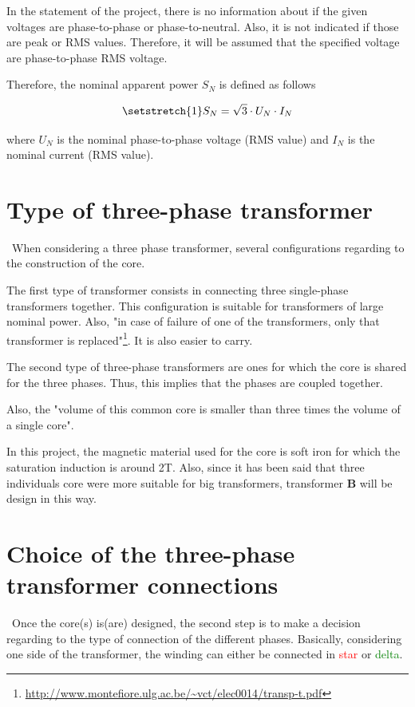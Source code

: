 \documentclass[12pt,a4paper]{report}
\begin{document}
In the statement of the project, there is no information about if the given voltages are phase-to-phase or phase-to-neutral. Also, it is not indicated if those are peak or RMS values. Therefore, it will be assumed that the specified voltage are phase-to-phase RMS voltage.

Therefore, the nominal apparent power $S_N$ is defined as follows

\begin{equation}
\setstretch{1}
    S_N = \sqrt{3}\cdot U_N\cdot I_N
\end{equation}

where $U_N$ is the nominal phase-to-phase voltage (RMS value) and $I_N$ is the nominal current (RMS value).
\section{Type of three-phase transformer}
\quad\, When considering a three phase transformer, several configurations regarding to the construction of the core.

The first type of transformer consists in connecting three single-phase transformers together. This configuration is suitable for transformers of large nominal power. Also, "in case of failure of one of the transformers, only that transformer is replaced"\footnote{\url{http://www.montefiore.ulg.ac.be/~vct/elec0014/transp-t.pdf}}. It is also easier to carry.

The second type of three-phase transformers are ones for which the core is shared for the three phases. Thus, this implies that the phases are coupled together.

Also, the "volume of this common core is smaller than three times the volume of a single core".

In this project, the magnetic material used for the core is soft iron for which the saturation induction is around 2T. Also, since it has been said that three individuals core were more suitable for big transformers, transformer \textbf{B} will be design in this way.

\section{Choice of the three-phase transformer connections}
\quad\, Once the core(s) is(are) designed, the second step is to make a decision regarding to the type of connection of the different phases. Basically, considering one side of the transformer, the winding can either be connected in \textcolor{red}{star} or \textcolor{green}{delta}.
\end{document}
